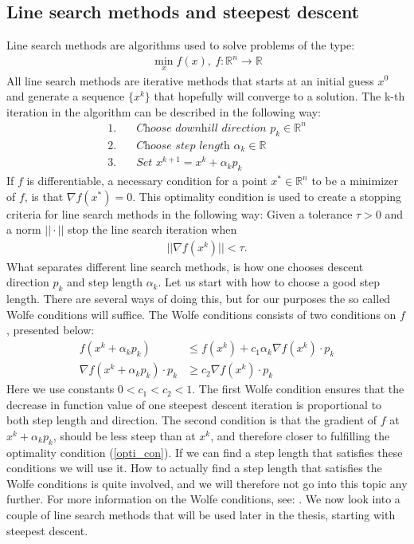 \subsection{Line search methods and steepest descent}
Line search methods are algorithms used to solve problems of the type: 
\begin{align*}
\min_x f(x), \ f:\mathbb{R}^n\longrightarrow\mathbb{R}
\end{align*}
All line search methods are iterative methods that starts at an initial guess $x^0$ and generate a sequence $\{x^k\}$ that hopefully will converge to a solution. The k-th iteration in the algorithm can be described in the following way:
\begin{align*}
1.\quad&\textit{Choose downhill direction $p_k\in\mathbb{R}^n$} \\
2.\quad&\textit{Choose step length $\alpha_k\in\mathbb{R}$} \\
3.\quad&\textit{Set $x^{k+1}=x^k + \alpha_kp_k$} 
\end{align*}
If $f$ is differentiable, a necessary condition for a point $x^*\in\mathbb{R}^n$ to be a minimizer of $f$, is that $\nabla f(x^*)=0$. This optimality condition is used to create a stopping criteria for line search methods in the following way: Given a tolerance $\tau>0$ and a norm $||\cdot||$ stop the line search iteration when
\begin{align}
||\nabla f(x^k)||<\tau. \label{opti_con}
\end{align}  
What separates different line search methods, is how one chooses descent direction $p_k$ and step length $\alpha_k$. Let us start with how to choose a good step length. There are several ways of doing this, but for our purposes the so called Wolfe conditions will suffice. The Wolfe conditions consists of two conditions on $f$, presented below:
\begin{align*}
f(x^k + \alpha_kp_k)&\leq f(x^k) + c_1\alpha_k\nabla f(x^k)\cdot p_k \\
\nabla f(x^k + \alpha_kp_k) \cdot p_k &\geq c_2 \nabla f(x^k)\cdot p_k
\end{align*}
Here we use constants $0<c_1<c_2<1$. The first Wolfe condition ensures that the decrease in function value of one steepest descent iteration is proportional to both step length and direction. The second condition is that the gradient of $f$ at $x^k + \alpha_kp_k$, should be less steep than at $x^k$, and therefore closer to fulfilling the optimality condition (\ref{opti_con}). If we can find a step length that satisfies these conditions we will use it. How to actually find a step length that satisfies the Wolfe conditions is quite involved, and we will therefore not go into this topic any further. For more information on the Wolfe conditions, see: \cite{wolfe1969convergence, wolfe1971convergence}. We now look into a couple of line search methods that will be used later in the thesis, starting with steepest descent.
